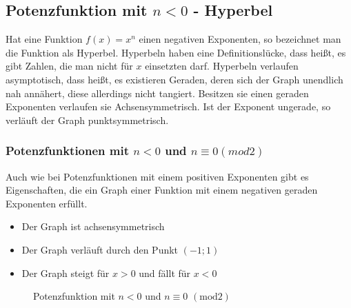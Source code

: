 \subsection{Potenzfunktion mit $n<0$ - Hyperbel}\label{sec:Potenzfunktionen/Potenzfunktionen mit negativem Exponenten}
Hat eine Funktion $f(x)=x^n$ einen negativen Exponenten, so bezeichnet man die Funktion als Hyperbel. Hyperbeln haben eine Definitionslücke, dass heißt, es gibt Zahlen, die man nicht für $x$ einsetzten darf. Hyperbeln verlaufen asymptotisch, dass heißt, es existieren Geraden, deren sich der Graph unendlich nah annähert, diese allerdings nicht tangiert. Besitzen sie einen geraden Exponenten verlaufen sie Achsensymmetrisch. Ist der Exponent ungerade, so verläuft der Graph punktsymmetrisch. 
\subsubsection{Potenzfunktionen mit $n<0$ und $n\equiv0(mod2)$}
Auch wie bei Potenzfunktionen mit einem positiven Exponenten gibt es Eigenschaften, die ein Graph einer Funktion mit einem negativen geraden Exponenten erfüllt.
\begin{itemize}
	\item Der Graph ist achsensymmetrisch
	\item Der Graph verläuft durch den Punkt $(-1;1)$
	\item Der Graph steigt für $x>0$ und fällt für $x<0$
\end{itemize}
\begin{figure}[h]
\centering
{}
\caption{Potenzfunktion mit $n<0$ und $ n\equiv0$ $(\mathrm{mod}2)$}
\end{figure}
